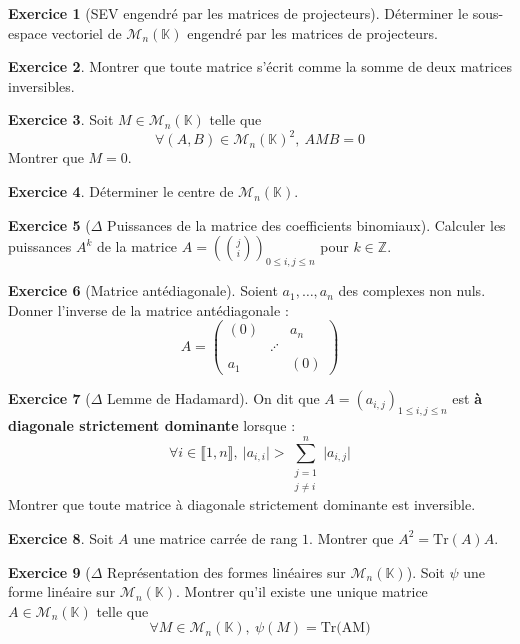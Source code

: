 \documentclass[french]{book}
\newcommand{\Z}{\mathbb{Z}}
\newcommand{\K}{\mathbb{K}}
\newcommand{\Tr}{\text{Tr}}
\theoremstyle{definition}
\newtheorem{ex}{Exercice}[chapter]
\theoremstyle{theorem}
\theoremstyle{remark}
\begin{document}
\begin{ex}[SEV engendré par les matrices de projecteurs]
	Déterminer le sous-espace vectoriel de $\mathcal{M}_n(\K)$ engendré par les matrices de projecteurs.
\end{ex}

\begin{ex}
	Montrer que toute matrice s'écrit comme la somme de deux matrices inversibles.
\end{ex}

\begin{ex}
	Soit $M\in\mathcal{M}_n(\K)$ telle que $$\forall (A,B)\in\mathcal{M}_n(\K)^2,\ AMB=0$$ Montrer que $M=0$. 
\end{ex}

\begin{ex}
	Déterminer le centre de $\mathcal{M}_n(\K)$.
\end{ex}

\begin{ex}[$\Delta$ Puissances de la matrice des coefficients binomiaux] Calculer les puissances $A^k$ de la matrice $A=\displaystyle\left(\binom{j}{i}\right)_{0\leqslant i,j\leqslant n}$ pour $k\in\Z$.
\end{ex}

\begin{ex}[Matrice antédiagonale]	Soient $a_1,\ldots,a_n$ des complexes non nuls. Donner l'inverse de la matrice antédiagonale : $$A=\begin{pmatrix}
		(0)&&a_n \\
		&\iddots&\\
		a_1&&(0)
	\end{pmatrix}$$
\end{ex}

\begin{ex}[$\Delta$ Lemme de Hadamard]
	On dit que $A=(a_{i,j})_{1\leqslant i,j\leqslant n}$ est \textbf{à diagonale strictement dominante} lorsque : $$\forall i\in\llbracket1,n\rrbracket,\ \lvert a_{i,i}\rvert>\sum_{\substack{j=1\\ j\ne i}}^{n}\lvert a_{i,j}\rvert$$ Montrer que toute matrice à diagonale strictement dominante est inversible.
\end{ex}

\begin{ex}
	Soit $A$ une matrice carrée de rang $1$. Montrer que $A^2=\Tr(A)A$.
\end{ex}

\begin{ex}[$\Delta$ Représentation des formes linéaires sur $\mathcal{M}_n(\K)$]
	Soit $\psi$ une forme linéaire sur $\mathcal{M}_n(\K)$. Montrer qu'il existe une unique matrice $A\in\mathcal{M}_n(\K)$ telle que $$\forall M\in\mathcal{M}_n(\K),\ \psi(M)=\text{Tr(AM)}$$
\end{ex}
\end{document}

